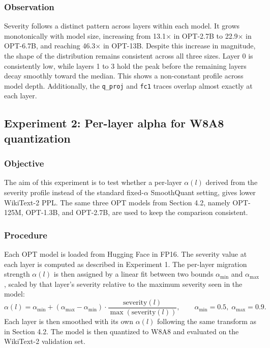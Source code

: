 \subsubsection*{Observation}
Severity follows a distinct pattern across layers within each model. It grows monotonically with model size, increasing from 13.1$\times$ in OPT-2.7B to 22.9$\times$ in OPT-6.7B, and reaching 46.3$\times$ in OPT-13B. Despite this increase in magnitude, the shape of the distribution remains consistent across all three sizes. Layer 0 is consistently low, while layers 1 to 3 hold the peak before the remaining layers decay smoothly toward the median. This shows a non-constant profile across model depth. Additionally, the \texttt{q\_proj} and \texttt{fc1} traces overlap almost exactly at each layer.

\subsection*{Experiment 2: Per-layer alpha for W8A8 quantization}

\subsubsection*{Objective}
The aim of this experiment is to test whether a per-layer $\alpha(l)$ derived from the severity profile instead of the standard fixed-$\alpha$ SmoothQuant setting, gives lower WikiText-2 PPL. The same three OPT models from Section 4.2, namely OPT-125M, OPT-1.3B, and OPT-2.7B, are used to keep the comparison consistent.

\subsubsection*{Procedure}
Each OPT model is loaded from Hugging Face in FP16. The severity value at each layer is computed as described in Experiment 1. The per-layer migration strength $\alpha(l)$ is then assigned by a linear fit between two bounds $\alpha_{\min}$ and $\alpha_{\max}$, scaled by that layer's severity relative to the maximum severity seen in the model:
$$
\alpha(l) = \alpha_{\min} + (\alpha_{\max} - \alpha_{\min}) \cdot \frac{\text{severity}(l)}{\max(\text{severity}(l))}, \qquad \alpha_{\min}=0.5,\; \alpha_{\max}=0.9.
$$
Each layer is then smoothed with its own $\alpha(l)$ following the same transform as in Section 4.2. The model is then quantized to W8A8 and evaluated on the WikiText-2 validation set.

